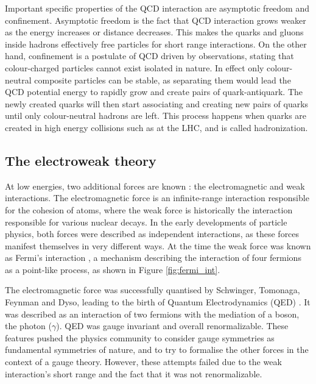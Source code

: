 Important specific properties of the QCD interaction are asymptotic freedom and confinement. Asymptotic freedom is the fact that QCD interaction grows weaker as the energy increases or distance decreases. This makes the quarks and gluons inside hadrons effectively free particles for short range interactions. On the other hand, confinement is a postulate of QCD driven by observations, stating that colour-charged particles cannot exist isolated in nature. In effect only colour-neutral composite particles can be stable, as separating them would lead the QCD potential energy to rapidly grow and create pairs of quark-antiquark. The newly created quarks will then start associating and creating new pairs of quarks until only colour-neutral hadrons are left. This process happens when quarks are created in high energy collisions such as at the LHC, and is called hadronization.

\subsection{The electroweak theory}
\label{sec:EWtheory}
At low energies, two additional forces are known : the electromagnetic and weak interactions. The electromagnetic force is an infinite-range interaction responsible for the cohesion of atoms, where the weak force is historically the interaction responsible for various nuclear decays. In the early developments of particle physics, both forces were described as independent interactions, as these forces manifest themselves in very different ways. At the time the weak force was known as Fermi's interaction \cite{Fermi2008}, a mechanism describing the interaction of four fermions as a point-like process, as shown in Figure \ref{fig:fermi_int}.

The electromagnetic force was successfully quantised by Schwinger, Tomonaga, Feynman and Dyso, leading to the birth of Quantum Electrodynamics (QED) \cite{PhysRev.80.440,PhysRev.76.749,PhysRev.76.769,PhysRev.74.1439,PhysRev.73.416,10.1143/PTP.1.27} . It was described as an interaction of two fermions with the mediation of a boson, the photon ($\gamma$). QED was gauge invariant and overall renormalizable. These features pushed the physics community to consider gauge symmetries as fundamental symmetries of nature, and to try to formalise the other forces in the context of a gauge theory. However, these attempts failed due to the weak interaction's short range and the fact that it was not renormalizable.

